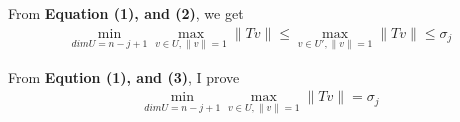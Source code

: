 \documentclass{article}
\begin{document}
From \textbf{Equation (1), and (2)}, we get 
\begin{equation}
    \begin{split}
        \mathop{min} \limits_{dimU = n - j + 1} \mathop{max} \limits _{v \in U, \|v\| = 1} \|Tv\| \le \mathop{max} \limits _{v \in U', \|v\| = 1} \|Tv\| \le \sigma_j
    \end{split}
\end{equation}

From \textbf{Eqution (1), and (3)}, I prove \begin{equation*}
    \begin{split}
        \mathop{min} \limits_{dimU = n - j + 1} \mathop{max} \limits _{v \in U, \|v\| = 1} \|Tv\| = \sigma_j
    \end{split}
\end{equation*} 
\end{document}
